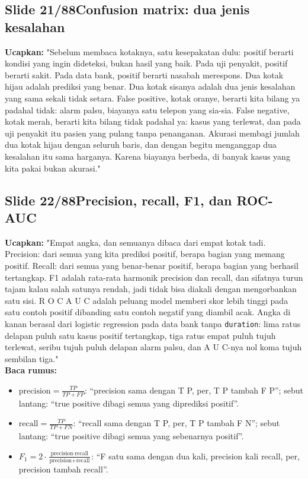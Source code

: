 \documentclass[11pt]{article}
\renewcommand{\framebox}[1]{\colorbox{acc!15}{\textcolor{acc}{\textbf{#1}}}}
\begin{document}
\subsection*{\framebox{Slide 21/88}\quad Confusion matrix: dua jenis kesalahan}
\textbf{Ucapkan:} "Sebelum membaca kotaknya, satu kesepakatan dulu: positif berarti kondisi yang ingin dideteksi, bukan hasil yang baik. Pada uji penyakit, positif berarti sakit. Pada data bank, positif berarti nasabah merespons. Dua kotak hijau adalah prediksi yang benar. Dua kotak sisanya adalah dua jenis kesalahan yang sama sekali tidak setara. False positive, kotak oranye, berarti kita bilang ya padahal tidak: alarm palsu, biayanya satu telepon yang sia-sia. False negative, kotak merah, berarti kita bilang tidak padahal ya: kasus yang terlewat, dan pada uji penyakit itu pasien yang pulang tanpa penanganan. Akurasi membagi jumlah dua kotak hijau dengan seluruh baris, dan dengan begitu menganggap dua kesalahan itu sama harganya. Karena biayanya berbeda, di banyak kasus yang kita pakai bukan akurasi."\\[2pt]

\subsection*{\framebox{Slide 22/88}\quad Precision, recall, F1, dan ROC-AUC}
\textbf{Ucapkan:} "Empat angka, dan semuanya dibaca dari empat kotak tadi. Precision: dari semua yang kita prediksi positif, berapa bagian yang memang positif. Recall: dari semua yang benar-benar positif, berapa bagian yang berhasil tertangkap. F1 adalah rata-rata harmonik precision dan recall, dan sifatnya turun tajam kalau salah satunya rendah, jadi tidak bisa diakali dengan mengorbankan satu sisi. R O C A U C adalah peluang model memberi skor lebih tinggi pada satu contoh positif dibanding satu contoh negatif yang diambil acak. Angka di kanan berasal dari logistic regression pada data bank tanpa \texttt{duration}: lima ratus delapan puluh satu kasus positif tertangkap, tiga ratus empat puluh tujuh terlewat, seribu tujuh puluh delapan alarm palsu, dan A U C-nya nol koma tujuh sembilan tiga."\\[2pt]
\textbf{Baca rumus:}\\[2pt]
\begin{itemize}\setlength\itemsep{0.2em}
\item $\text{precision} = \frac{TP}{TP + FP}$: ``precision sama dengan T P, per, T P tambah F P''; sebut lantang: ``true positive dibagi semua yang diprediksi positif''.
\item $\text{recall} = \frac{TP}{TP + FN}$: ``recall sama dengan T P, per, T P tambah F N''; sebut lantang: ``true positive dibagi semua yang sebenarnya positif''.
\item $F_1 = 2\cdot\frac{\text{precision}\cdot\text{recall}}{\text{precision}+\text{recall}}$: ``F satu sama dengan dua kali, precision kali recall, per, precision tambah recall''.
\end{itemize}
\end{document}
